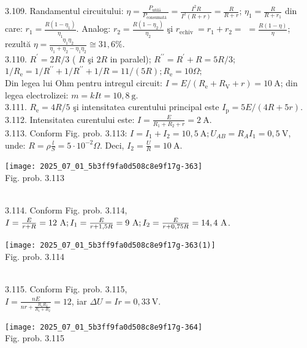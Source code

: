 3.109. Randamentul circuitului: $\eta=\frac{P_{\text {utilā }}}{P_{\text {consumată }}}=\frac{I^{2} R}{I^{2}(R+r)}=\frac{R}{R+r}$; $\eta_{1}=\frac{R}{R+r_{1}}$ din care: $r_{1}=\frac{R\left(1-\eta_{1}\right)}{\eta_{1}}$. Analog: $r_{2}=\frac{R\left(1-\eta_{2}\right)}{\eta_{2}}$ şi $r_{\text {echiv }}=r_{1}+r_{2}=$ $=\frac{R(1-\eta)}{\eta}$; rezultă $\eta=\frac{\eta_{1} \eta_{2}}{\eta_{1}+\eta_{2}-\eta_{1} \eta_{2}} \cong 31,6 \%$.\\

3.110. $R^{\prime}=2 R / 3$ ( $R$ şi $2 R$ in paralel); $R^{\prime \prime}=R^{\prime}+R=5 R / 3$;\\ $1 / R_{\mathrm{e}}=1 / R^{\prime \prime}+1 / R^{\prime \prime}+1 / R=11 /(5 R) ; R_{\mathrm{e}}=10 \Omega ;$\\ Din legea lui Ohm pentru intregul circuit: $I=E /\left(R_{\mathrm{e}}+R_{\mathrm{V}}+r\right)=10 \mathrm{~A}$; din legea electrolizei: $m=k I t=10,8 \mathrm{~g}$.\\

3.111. $R_{\mathrm{e}}=4 R / 5$ şi intensitatea curentului principal este $I_{\mathrm{p}}=5 E /(4 R+5 r)$.\\

3.112. Intensitatea curentului este: $I=\frac{E}{R_{1}+R_{2}+r}=2 \mathrm{~A}$.\\

3.113. Conform Fig. prob. 3.113: $I=I_{1}+I_{2}=10,5 \mathrm{~A} ; U_{A B}=R_{A} I_{1}=0,5 \mathrm{~V}$, unde: $R=\rho \frac{l}{S}=5 \cdot 10^{-2} \Omega$. Deci, $I_{2}=\frac{U}{R}=10 \mathrm{~A}$.\\ \begin{center} \texttt{[image: 2025\_07\_01\_5b3ff9fa0d508c8e9f17g-363]}\\ Fig. prob. 3.113 \end{center}\\

3.114. Conform Fig. prob. 3.114,\\ $I=\frac{E}{r+R}=12 \mathrm{~A} ; I_{1}=\frac{E}{r+1,5 R}=9 \mathrm{~A} ; \\ I_{2}=\frac{E}{r+0,75 R}=14,4 \mathrm{~A}$.\\ \begin{center} \texttt{[image: 2025\_07\_01\_5b3ff9fa0d508c8e9f17g-363(1)]}\\ Fig. prob. 3.114 \end{center}\\

3.115. Conform Fig. prob. 3.115,\\ $I=\frac{n E}{n r+\frac{R_{1} R_{2}}{R_{1}+R_{2}}}=12$, iar $\Delta U=I r=0,33 \mathrm{~V}$.\\ \begin{center} \texttt{[image: 2025\_07\_01\_5b3ff9fa0d508c8e9f17g-364]}\\ Fig. prob. 3.115 \end{center}\\

